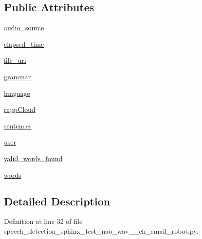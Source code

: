 \subsection*{Public Attributes}
\begin{DoxyCompactItemize}
\item 
\hyperlink{classspeech__detection__sphinx__test__nao__wav__1__ch__email__robot_1_1RappInterfaceTest_ad02bafa1c2c98a097a731d581b50ece1}{audio\-\_\-source}
\item 
\hyperlink{classspeech__detection__sphinx__test__nao__wav__1__ch__email__robot_1_1RappInterfaceTest_a306c66ca9da9703a83a2f42de67ff42c}{elapsed\-\_\-time}
\item 
\hyperlink{classspeech__detection__sphinx__test__nao__wav__1__ch__email__robot_1_1RappInterfaceTest_a2478211b72fe2a06fafd16824b90b913}{file\-\_\-uri}
\item 
\hyperlink{classspeech__detection__sphinx__test__nao__wav__1__ch__email__robot_1_1RappInterfaceTest_a5dd5ff2a3d65439bf832680c9210c551}{grammar}
\item 
\hyperlink{classspeech__detection__sphinx__test__nao__wav__1__ch__email__robot_1_1RappInterfaceTest_a19be350e039bc299ed9e4b64cdd88cce}{language}
\item 
\hyperlink{classspeech__detection__sphinx__test__nao__wav__1__ch__email__robot_1_1RappInterfaceTest_a101cd9b16dfc9fa1957ff86aeb42e40c}{rapp\-Cloud}
\item 
\hyperlink{classspeech__detection__sphinx__test__nao__wav__1__ch__email__robot_1_1RappInterfaceTest_a1e054c4a11f5367e2d9d930b9976e036}{sentences}
\item 
\hyperlink{classspeech__detection__sphinx__test__nao__wav__1__ch__email__robot_1_1RappInterfaceTest_a3b6f8d8782e2730f3c4d85040564c9f9}{user}
\item 
\hyperlink{classspeech__detection__sphinx__test__nao__wav__1__ch__email__robot_1_1RappInterfaceTest_abec6927bb982a13f7e41461658b8c32c}{valid\-\_\-words\-\_\-found}
\item 
\hyperlink{classspeech__detection__sphinx__test__nao__wav__1__ch__email__robot_1_1RappInterfaceTest_a4944d6b5e101452005755335a76a4248}{words}
\end{DoxyCompactItemize}


\subsection{Detailed Description}


Definition at line 32 of file speech\-\_\-detection\-\_\-sphinx\-\_\-test\-\_\-nao\-\_\-wav\-\_\-\_\-ch\-\_\-email\-\_\-robot.\-py.



